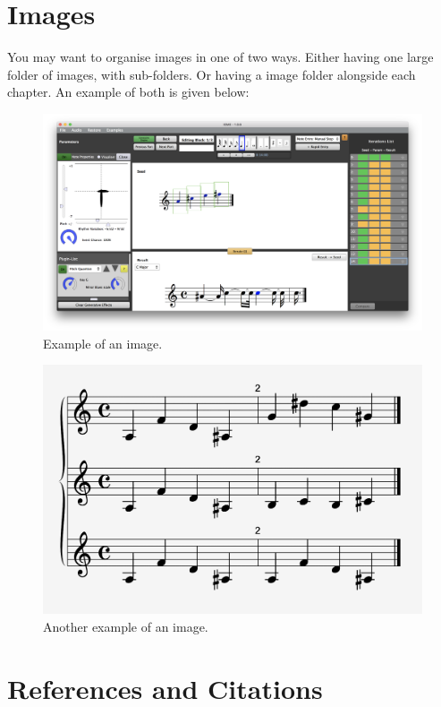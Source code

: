 \section{Images}

You may want to organise images in one of two ways. Either having one large folder of images, with sub-folders. Or having a image folder alongside each chapter. An example of both is given below:

\begin{figure}[h]
  \includegraphics[width=\linewidth]{Images/EditView}
  \caption{Example of an image.}
  \label{fig:igme1}
\end{figure}

\begin{figure}[h]
\begin{center}
  \includegraphics[width=0.6\linewidth]{Chapters/Evaluation/Images/partTypesScore}
  \caption{Another example of an image.}
  \label{fig:igme2}
  \end{center}
\end{figure}


\clearpage

\section{References and Citations}

